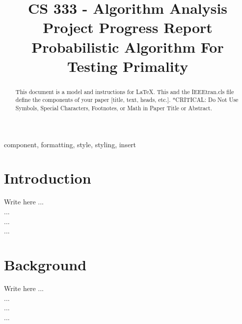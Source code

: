 \documentclass[conference]{IEEEtran}
\begin{document}
\title{ \large{CS 333 - Algorithm Analysis} \\ 
        \Huge{Project Progress Report}\\
        {\large Probabilistic Algorithm For Testing Primality }
}

\author{
\and
{}
\and
{}
}

\maketitle

\begin{abstract}
This document is a model and instructions for \LaTeX.
This and the IEEEtran.cls file define the components of your paper [title, text, heads, etc.]. *CRITICAL: Do Not Use Symbols, Special Characters, Footnotes, 
or Math in Paper Title or Abstract.
\end{abstract}

\begin{IEEEkeywords}
component, formatting, style, styling, insert
\end{IEEEkeywords}




\section{Introduction}
    Write here ... \\
    ...  \\
    ...  \\
    ...  




\section{Background}
    Write here ... \\
    ...  \\
    ...  \\
    ... 
    
\end{document}
